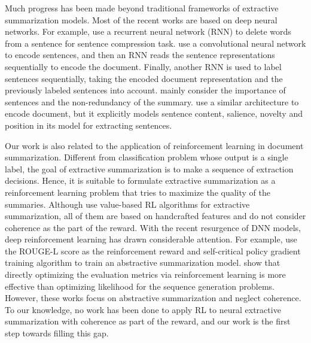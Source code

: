 \documentclass[letterpaper]{article} \usepackage{aaai18}  \usepackage{times}  \usepackage{helvet}  \usepackage{courier}  \usepackage{url}  \usepackage{graphicx}  \usepackage{amssymb}
\begin{document}
	Much progress has been made beyond traditional frameworks of extractive summarization models. Most of the recent works are based on deep neural networks. For example, \cite{filippova_sentence_2015} use a recurrent neural network (RNN) to delete words from a sentence for sentence compression task. \cite{jianpeng2016} use a convolutional neural network to encode sentences, and then an RNN reads the sentence representations sequentially to encode the document. Finally, another RNN is used to label sentences sequentially, taking the encoded document representation and the previously labeled sentences into account. \cite{jianpeng2016} mainly consider the importance of sentences and the non-redundancy of the summary. \cite{SummaRuNNer} use a similar architecture to encode document, but it explicitly models sentence content, salience, novelty and position in its model for extracting sentences.
	


	Our work is also related to the application of reinforcement learning in document summarization. Different from classification problem whose output is a single label, the goal of extractive summarization is to make a sequence of extraction decisions. Hence, it is suitable to formulate extractive summarization as a reinforcement learning problem that tries to maximize the quality of the summaries. Although \cite{ryang_framework_2012,rioux_fear_2014,hens_s_reinforcement_2015} use value-based RL algorithms for extractive summarization, all of them are based on handcrafted features and do not consider coherence as the part of the reward. With the recent resurgence of DNN models, deep reinforcement learning has drawn considerable attention. For example, \cite{socher2017_summarization} use the ROUGE-L score as the reinforcement reward and self-critical policy gradient training algorithm to train an abstractive summarization model. \cite{ayana2016,sltrnn2016} show that directly optimizing the evaluation metrics via reinforcement learning is more effective than optimizing likelihood for the sequence generation problems. However, these works focus on abstractive summarization and neglect coherence. To our knowledge, no work has been done to apply RL to neural extractive summarization with coherence as part of the reward, and our work is the first step towards filling this gap.
	
\end{document}
